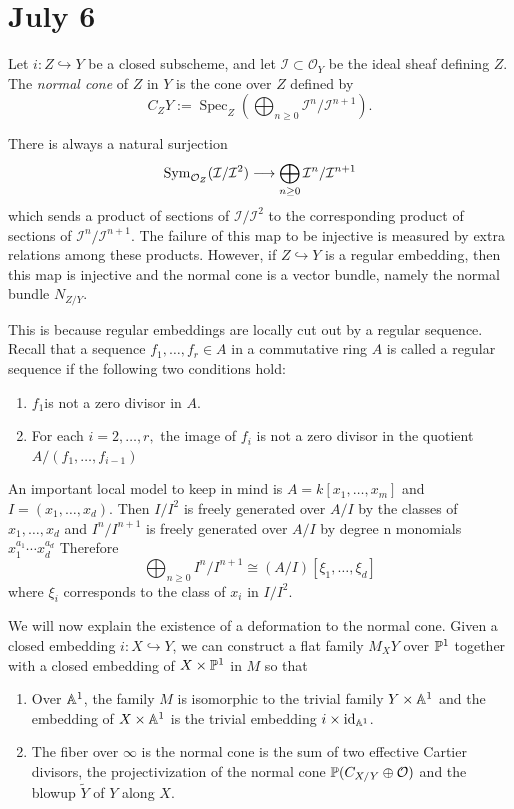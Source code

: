 \documentclass[12pt]{article}
\begin{document}
\section{July 6}
\begin{definition}
    Let $i:Z\hookrightarrow Y$
    be a closed subscheme, and let $\mathcal I\subset \mathcal O_Y$ be the ideal sheaf defining $Z$. The \emph{normal cone} of $Z$ in $Y$ is the cone over $Z$ defined by
    \[
        C_ZY
        :=
        \operatorname{Spec}_Z
        \left(
            \bigoplus_{n\geq 0}
            \mathcal I^n/\mathcal I^{n+1}
        \right).
    \]
\end{definition}
There is always a natural surjection \begin{align*}
    \Sym_{\mathcal O_Z}(\mathcal I/\mathcal I^2)
    \longrightarrow
    \bigoplus_{n\geq 0}
    \mathcal I^n/\mathcal I^{n+1}
\end{align*} which sends a product of sections of $\mathcal I/\mathcal I^2$ to the corresponding product of sections of $\mathcal I^n/\mathcal I^{n+1}$. The failure of this map to be injective is measured by extra relations among these products. However, if $Z\hookrightarrow Y$ is a regular embedding, then this map is injective and the normal cone is a vector bundle, namely the normal bundle $N_{Z/Y}$. 

This is because regular embeddings are locally cut out by a regular sequence. Recall that a sequence $f_1,\dots,f_r\in A$ in a commutative ring $A$ is called a regular sequence if the following two conditions hold:
\begin{enumerate}
    \item $f_1 $is not a zero divisor in $A$.
    \item For each $i=2,\dots,r,$ the image of $f_i$ is not a zero divisor in the quotient $A/(f_1,\dots,f_{i-1})$  
\end{enumerate} An important local model to keep in mind is 
$A=k[x_1,\dots,x_m]$ and $I=(x_1,\dots,x_d)$. Then $I/I^2$ is freely generated over $A/I$ by the classes of $x_1,\dots,x_d$ and $I^n/I^{n+1}$ is freely generated over $A/I$ by degree n monomials $x_1^{a_1}\cdots x_d^{a_d}$
Therefore \[\bigoplus_{n\geq 0} I^n/I^{n+1}
\cong(A/I)[\xi_1,\dots,\xi_d]\] where $\xi_i$ corresponds to the class of $x_i$ in $I/I^2$. 

We will now explain the existence of a deformation to the normal cone. Given a closed embedding $i:X\hookrightarrow Y$, we can construct a flat family $M_XY$ over $\P^1$ together with a closed embedding of $X\times \P^1$ in $M$ so that \begin{enumerate}
    \item Over $\A^1$, the family $M$ is isomorphic to the trivial family $Y\times \A^1$ and the embedding of $X\times \A^1$ is the trivial embedding $i\times \id_{\A^1}$.
    \item The fiber over $\infty$ is the normal cone is the sum of two effective Cartier divisors, the projectivization of the normal cone $\P(C_{X/Y}\oplus \mathcal O)$ and the blowup $ \tilde Y $ of $Y$ along $X$.
\end{enumerate}
\end{document}

